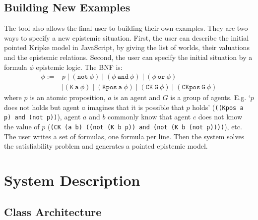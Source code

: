 \documentclass{article}
\begin{document}
\subsection{Building New Examples}

The tool also allows the final user to building their own examples. They are two ways to specify a new epistemic situation. First, the user can describe the initial pointed Kripke model in JavaScript, by giving the list of worlds, their valuations and the epistemic relations. Second, the user can specify the initial situation by a formula $\phi$ epistemic logic. The BNF is:
%
%	
$$\begin{array}{ll}\phi := & p \mid (\mathtt{not~} \phi) \mid (\phi \mathtt {~and~} \phi) \mid (\phi \mathtt {~or~} \phi)  \\ & \mid \mathtt{(K~a~\phi)} \mid \mathtt{(Kpos~a~\phi)} \mid \mathtt{(CK~G~\phi)}\mid \mathtt{(CKpos~G~\phi)}\end{array}$$
%
where $p$ is an atomic proposition, $a$ is an agent and $G$ is a group of agents. E.g. `$p$ does not holds but agent $a$ imagines that it is possible that $p$ holds' (\texttt{((Kpos a p) and (not p))}), agent $a$ and $b$ commonly know that agent $c$ does not know the value of $p$ (\texttt{(CK (a b) ((not (K b p)) and (not (K b (not p))))}), etc. The user writes a set of formulas, one formula per line.
%
%	
Then the system solves the satisfiability problem and generates a pointed epistemic model.









\section{System Description}
\label{section:architecture}

\subsection{Class Architecture}
\end{document}
